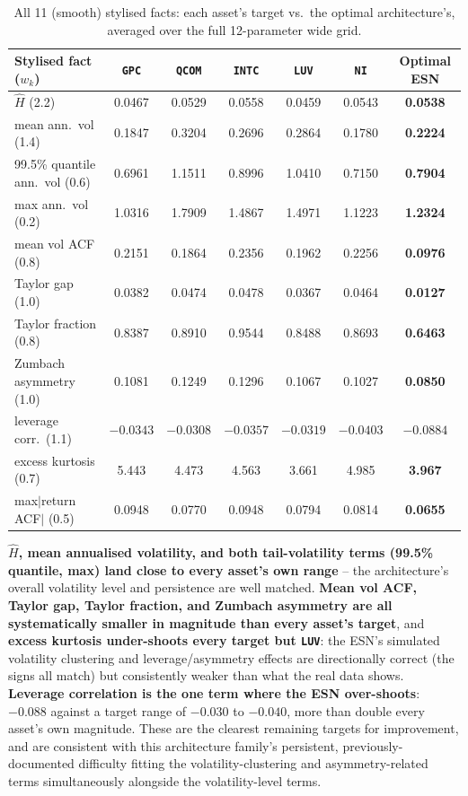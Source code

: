 \documentclass[11pt]{article}
\begin{document}
\begin{table}[h]
\centering
\small
\caption{All 11 (smooth) stylised facts: each asset's target vs.\ the optimal architecture's, averaged over the full 12-parameter wide grid.}
\label{tab:avgstats}
\begin{tabular}{lccccc c}
\toprule
Stylised fact ($w_k$) & \texttt{GPC} & \texttt{QCOM} & \texttt{INTC} & \texttt{LUV} & \texttt{NI} & \textbf{Optimal ESN} \\
\midrule
$\hat H$ (2.2) & 0.0467 & 0.0529 & 0.0558 & 0.0459 & 0.0543 & \textbf{0.0538} \\
mean ann.\ vol (1.4) & 0.1847 & 0.3204 & 0.2696 & 0.2864 & 0.1780 & \textbf{0.2224} \\
99.5\% quantile ann.\ vol (0.6) & 0.6961 & 1.1511 & 0.8996 & 1.0410 & 0.7150 & \textbf{0.7904} \\
max ann.\ vol (0.2) & 1.0316 & 1.7909 & 1.4867 & 1.4971 & 1.1223 & \textbf{1.2324} \\
mean vol ACF (0.8) & 0.2151 & 0.1864 & 0.2356 & 0.1962 & 0.2256 & \textbf{0.0976} \\
Taylor gap (1.0) & 0.0382 & 0.0474 & 0.0478 & 0.0367 & 0.0464 & \textbf{0.0127} \\
Taylor fraction (0.8) & 0.8387 & 0.8910 & 0.9544 & 0.8488 & 0.8693 & \textbf{0.6463} \\
Zumbach asymmetry (1.0) & 0.1081 & 0.1249 & 0.1296 & 0.1067 & 0.1027 & \textbf{0.0850} \\
leverage corr.\ (1.1) & $-0.0343$ & $-0.0308$ & $-0.0357$ & $-0.0319$ & $-0.0403$ & \textbf{$-0.0884$} \\
excess kurtosis (0.7) & 5.443 & 4.473 & 4.563 & 3.661 & 4.985 & \textbf{3.967} \\
max$|$return ACF$|$ (0.5) & 0.0948 & 0.0770 & 0.0948 & 0.0794 & 0.0814 & \textbf{0.0655} \\
\bottomrule
\end{tabular}
\end{table}

\textbf{$\hat H$, mean annualised volatility, and both tail-volatility terms
(99.5\% quantile, max) land close to every asset's own range} -- the architecture's
overall volatility level and persistence are well matched. \textbf{Mean vol ACF,
Taylor gap, Taylor fraction, and Zumbach asymmetry are all systematically smaller in
magnitude than every asset's target}, and \textbf{excess kurtosis under-shoots every
target but \texttt{LUV}}: the ESN's simulated volatility clustering and
leverage/asymmetry effects are directionally correct (the signs all match) but
consistently weaker than what the real data shows. \textbf{Leverage correlation is
the one term where the ESN over-shoots}: $-0.088$ against a target range of
$-0.030$ to $-0.040$, more than double every asset's own magnitude. These are the
clearest remaining targets for improvement, and are consistent with this
architecture family's persistent, previously-documented difficulty fitting the
volatility-clustering and asymmetry-related terms simultaneously alongside the
volatility-level terms.
\end{document}
